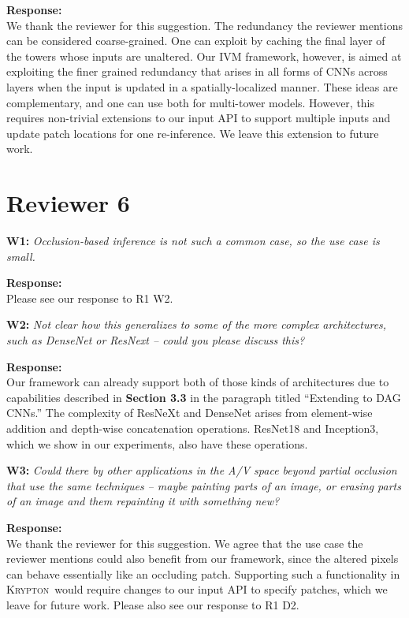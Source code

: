 \documentclass[preprint]{vldb}
\newcommand{\system}{\textsc{Krypton}}
\begin{document}
\vspace{2mm}
\noindent \textbf{Response:}\\
We thank the reviewer for this suggestion. The redundancy the reviewer mentions can be considered coarse-grained. One can exploit by caching the final layer of the towers whose inputs are unaltered. Our IVM framework, however, is aimed at exploiting the finer grained redundancy that arises in all forms of CNNs across layers when the input is updated in a spatially-localized manner. These ideas are complementary, and one can use both for multi-tower models. However, this requires non-trivial extensions to our input API to support multiple inputs and update patch locations for one re-inference. We leave this extension to future work.


\section{Reviewer 6}

\vspace{2mm}
\noindent \textbf{W1:} \textit{Occlusion-based inference is not such a common case, so the use case is small.}

\vspace{2mm}
\noindent \textbf{Response:}\\
Please see our response to R1 W2.

\vspace{2mm}
\noindent \textbf{W2:} \textit{Not clear how this generalizes to some of the more complex architectures, such as DenseNet or ResNext -- could you please discuss this?}

\vspace{2mm}
\noindent \textbf{Response:}\\
Our framework can already support both of those kinds of architectures due to capabilities described in \textbf{Section 3.3} in the paragraph titled ``Extending to DAG CNNs.'' The complexity of ResNeXt and DenseNet arises from element-wise addition and depth-wise concatenation operations. ResNet18 and Inception3, which we show in our experiments, also have these operations.

\vspace{2mm}
\noindent \textbf{W3:} \textit{Could there by other applications in the A/V space beyond partial occlusion that use the same techniques -- maybe painting parts of an image, or erasing parts of an image and them repainting it with something new?}

\vspace{2mm}
\noindent \textbf{Response:}\\
We thank the reviewer for this suggestion. We agree that the use case the reviewer mentions could also benefit from our framework, since the altered pixels can behave essentially like an occluding patch. Supporting such a functionality in \system ~would require changes to our input API to specify patches, which we leave for future work. Please also see our response to R1 D2.
\end{document}
